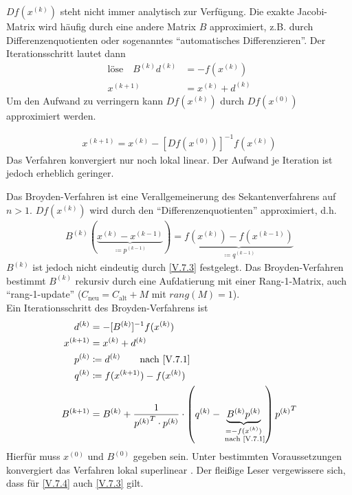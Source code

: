 $Df(x^{(k)})$ steht nicht immer analytisch zur Verfügung.
Die exakte Jacobi-Matrix wird häufig durch eine andere Matrix $B$ approximiert, 
z.B. durch Differenzenquotienten oder sogenanntes
\enquote{automatisches Differenzieren}.
Der Iterationsschritt lautet dann
\begin{align}
  \text{löse}\quad B^{(k)}d^{(k)} &= -f(x^{(k)}) 
                                    \label{V.7.1} \\\nonumber
  x^{(k+1)} &=x^{(k)} + d^{(k)}
\end{align}
Um den Aufwand zu verringern kann $Df(x^{(k)})$ durch
$Df(x^{(0)})$ approximiert werden.


\begin{gather}
  x^{(k+1)} = x^{(k)} -[Df(x^{(0)})]^{-1} f(x^{(k)})
  \label{V.7.2}
\end{gather}
Das Verfahren konvergiert nur noch lokal linear.
Der Aufwand je Iteration ist jedoch erheblich geringer.



Das Broyden-Verfahren ist eine Verallgemeinerung des Sekantenverfahrens
auf $n>1$. $Df(x^{(k)})$ wird durch den
\enquote{Differenzenquotienten} approximiert, d.h.
\begin{gather}
  B^{(k)}(\underbrace{x^{(k)}-x^{(k-1)}}_{\coloneqq p^{(k-1)}})
  = \underbrace{f(x^{(k)})-f(x^{(k-1)})}_{\coloneqq
    q^{(k-1)}}
  \label{V.7.3}
\end{gather}
$B^{(k)}$ ist jedoch nicht eindeutig durch \eqref{V.7.3} festgelegt.
Das Broyden-Verfahren bestimmt $B^{(k)}$ rekursiv durch eine 
Aufdatierung mit einer Rang-1-Matrix, auch \enquote{rang-1-update}
($C_\text{neu} = C_\text{alt} +M$ mit $rang(M)=1$). \\

Ein Iterationsschritt des Broyden-Verfahrens ist 
\begin{align}\nonumber
  d^{(k)} &= -[B^{(k)}]^{-1} f(x^{(k)}) \\\nonumber
  x^{(k+1)} &= x^{(k)} + d^{(k)} \\\nonumber
  p^{(k)} & \coloneqq d^{(k)} \qquad \text{nach
            \eqref{V.7.1}}\\\nonumber
  q^{(k)} & \coloneqq f(x^{(k+1)})-f(x^{(k)}) \\
  B^{(k+1)} & = B^{(k)} + \frac{1}{{p^{(k)}}^T\cdot p^{(k)}}
              \cdot \left(q^{(k)}-
              \underbrace{B^{(k)}p^{(k)}}_{\substack{=-f(x^{(k)})\\
  \text{ nach \eqref{V.7.1}}}}
  \right){p^{(k)}}^T
  \label{V.7.4}
\end{align}
Hierfür muss $x^{(0)} $ und $B^{(0)}$ gegeben sein.
Unter bestimmten Voraussetzungen konvergiert das Verfahren lokal
superlinear \cite[siehe][dortige Referenzen]{stoerbulirsch}.
Der fleißige Leser vergewissere sich, dass für
\eqref{V.7.4} auch \eqref{V.7.3} gilt.


